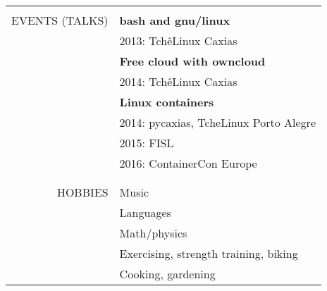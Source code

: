 \begin{center}
\begin{tabular}{rl}
    \\\\ \hline \\
    \uppercase{Events (talks)}
    & \textbf{bash and gnu/linux} \\
    & 2013: TchêLinux Caxias \\
    & \textbf{Free cloud with owncloud} \\
    & 2014: TchêLinux Caxias \\
    & \textbf{Linux containers} \\
    & 2014: pycaxias, TcheLinux Porto Alegre \\
    & 2015: FISL \\
    & 2016: ContainerCon Europe
    \\\\ \hline \\
    \uppercase{Hobbies}
    & Music \\
    & Languages \\
    & Math/physics \\
    & Exercising, strength training, biking \\
    & Cooking, gardening
\end{tabular}

\end{center}
